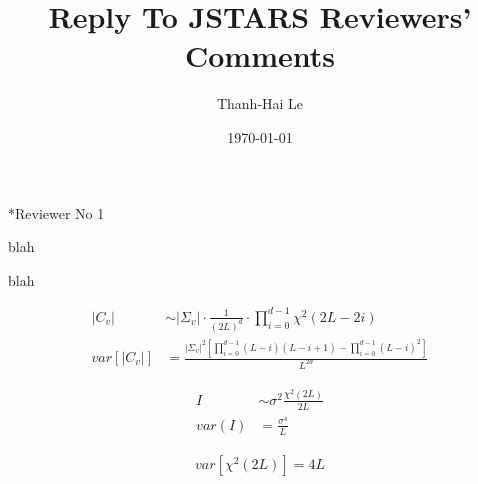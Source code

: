 \documentclass{article}
\title{Reply To JSTARS Reviewers' Comments}
\date{\today}
\author{Thanh-Hai Le}
\newcommand{\replyToComment}[2]{
\vspace{2mm}
\begin{description}
    [
      align=left,
      style=nextline,
      leftmargin=*,
      labelsep=\parindent,
      font=\normalfont
    ]
    \item[\textit{Comment:}]  {#1} 
    \item[\textit{Reply:}] {#2} 
\end{description} 
}
\begin{document}
\maketitle

\newenvironment{replyheader}{
	\vspace*{10mm}
\setcounter{page}{1}

\begin{tabular}{l l}
\bf{Name of Student:} & Le Thanh Hai \\
\bf{Degree:} & Doctor of Philosophy \\
\bf{Thesis Title:} & Scalar \& Homoskedastic Models \\ 
 & for SAR \& POLSAR data
\end{tabular}  
	\vspace*{10mm}
}

\subsection*{Reviewer No 1}

\replyToComment
    {blah}
    {blah}

\begin{align}
  |C_v| &\sim |\Sigma_v| \cdot \frac{1}{(2L)^d} \cdot \prod_{i=0}^{d-1} \chi^2 (2L-2i) \\
  var \left[ |C_v| \right]  &=   \frac{|\Sigma_v|^2 \left[ \prod^{d-1}_{i=0} (L-i)(L-i+1) - \prod^{d-1}_{i=0} (L-i)^2 \right] }{L^{2d}} 
\end{align}

\begin{align}
I &\sim \sigma^2 \frac{\chi^2(2L)}{2L} \\
var(I) &= \frac{\sigma^4}{L}
\end{align}

\begin{align}
var \left[ \chi^2 (2L) \right] = 4L
\end{align}

%

%

%
\end{document}

